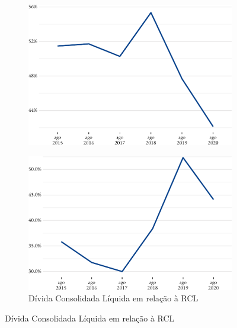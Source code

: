 \begin{figure}[!h]
\begin{subfigure}{\linewidth}
		\includegraphics{fig/desp_pessoal_rcl-1.pdf}
	\end{subfigure}
\end{figure}


\begin{figure}[!h]
	\begin{subfigure}{\linewidth}
		\caption{\label{fig:divida_rcl}Dívida Consolidada Líquida em relação à RCL}
		\includegraphics{fig/divida_rcl-1.pdf}
	\end{subfigure}
\end{figure}

